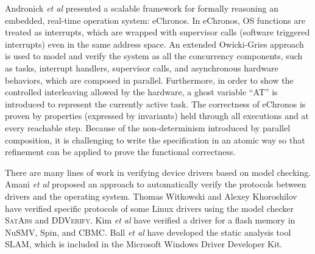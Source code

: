 Andronick {\em et al} \cite{Andronick2015, Andronick2016} presented
a scalable framework for formally reasoning an
embedded, real-time operation system: eChronos. In eChronos, OS functions are
treated as interrupts, which are wrapped with supervisor calls (software triggered
interrupts) even in the same address space. An extended Owicki-Gries approach
is used to model and verify the system as all the concurrency components,
such as tasks, interrupt handlers, supervisor calls, and asynchronous hardware
behaviors, which are composed in parallel. Furthermore, in order to show the
controlled interleaving allowed by the hardware, a ghost variable ``AT'' is
introduced to represent the currently active task. The correctness of eChronos
is proven by properties (expressed by invariants) held through all
executions and at every reachable step.  Because of the non-determinism
introduced by parallel composition, it is challenging to write the
specification in an atomic way so that refinement can be applied to prove the
functional correctness.

There are many lines of work in verifying device drivers based on
model checking. Amani {\em et al} \cite{Amani12} proposed an approach
to automatically verify the protocols between drivers and the
operating system.  Thomas Witkowski \cite{witkowski2007} and Alexey
Khoroshilov \cite{Khoroshilov2010} have verified specific protocols of
some Linux drivers using the model checker \textsc{SatAbs} and
\textsc{DDVerify}.  Kim {\em et al} \cite{Kim2008} have verified a
driver for a flash memory in NuSMV, Spin, and CBMC.  Ball {\em et al}
\cite{slam2} have developed the static analysis tool SLAM, which is
included in the Microsoft Windows Driver Developer Kit.
